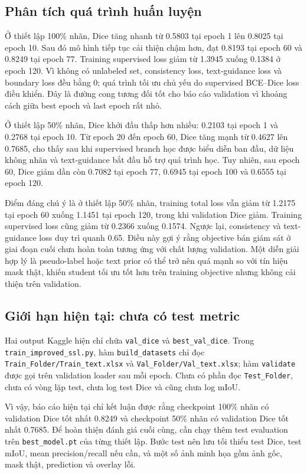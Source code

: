 \subsection{Phân tích quá trình huấn luyện}

Ở thiết lập 100\% nhãn, Dice tăng nhanh từ 0.5803 tại epoch 1 lên 0.8025 tại epoch 10. Sau đó mô hình tiếp tục cải thiện chậm hơn, đạt 0.8193 tại epoch 60 và 0.8249 tại epoch 77. Training supervised loss giảm từ 1.3945 xuống 0.1384 ở epoch 120. Vì không có unlabeled set, consistency loss, text-guidance loss và boundary loss đều bằng 0; quá trình tối ưu chủ yếu do supervised BCE--Dice loss điều khiển. Đây là đường cong tương đối tốt cho báo cáo validation vì khoảng cách giữa best epoch và last epoch rất nhỏ.

Ở thiết lập 50\% nhãn, Dice khởi đầu thấp hơn nhiều: 0.2103 tại epoch 1 và 0.2768 tại epoch 10. Từ epoch 20 đến epoch 60, Dice tăng mạnh từ 0.4627 lên 0.7685, cho thấy sau khi supervised branch học được biểu diễn ban đầu, dữ liệu không nhãn và text-guidance bắt đầu hỗ trợ quá trình học. Tuy nhiên, sau epoch 60, Dice giảm dần còn 0.7082 tại epoch 77, 0.6945 tại epoch 100 và 0.6555 tại epoch 120.

Điểm đáng chú ý là ở thiết lập 50\% nhãn, training total loss vẫn giảm từ 1.2175 tại epoch 60 xuống 1.1451 tại epoch 120, trong khi validation Dice giảm. Training supervised loss cũng giảm từ 0.2366 xuống 0.1574. Ngược lại, consistency và text-guidance loss duy trì quanh 0.65. Điều này gợi ý rằng objective bán giám sát ở giai đoạn cuối chưa hoàn toàn tương ứng với chất lượng validation. Một diễn giải hợp lý là pseudo-label hoặc text prior có thể trở nên quá mạnh so với tín hiệu mask thật, khiến student tối ưu tốt hơn trên training objective nhưng không cải thiện trên validation.

\subsection{Giới hạn hiện tại: chưa có test metric}

Hai output Kaggle hiện chỉ chứa \texttt{val\_dice} và \texttt{best\_val\_dice}. Trong \texttt{train\_improved\_ssl.py}, hàm \texttt{build\_datasets} chỉ đọc \texttt{Train\_Folder/Train\_text.xlsx} và \texttt{Val\_Folder/Val\_text.xlsx}; hàm \texttt{validate} được gọi trên validation loader sau mỗi epoch. Chưa có phần đọc \texttt{Test\_Folder}, chưa có vòng lặp test, chưa log test Dice và cũng chưa log mIoU.

Vì vậy, báo cáo hiện tại chỉ kết luận được rằng checkpoint 100\% nhãn có validation Dice tốt nhất 0.8249 và checkpoint 50\% nhãn có validation Dice tốt nhất 0.7685. Để hoàn thiện đánh giá cuối cùng, cần chạy thêm test evaluation trên \texttt{best\_model.pt} của từng thiết lập. Bước test nên lưu tối thiểu test Dice, test mIoU, mean precision/recall nếu cần, và một số ảnh minh họa gồm ảnh gốc, mask thật, prediction và overlay lỗi.

